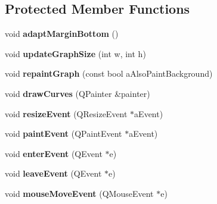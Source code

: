 \subsection*{Protected Member Functions}
\begin{DoxyCompactItemize}
\item 
\hypertarget{class_graph_view_a9ed59f9cc9a902cc3c407800ff1a64c2}{void {\bfseries adapt\-Margin\-Bottom} ()}\label{class_graph_view_a9ed59f9cc9a902cc3c407800ff1a64c2}

\item 
\hypertarget{class_graph_view_a0bda802ecad94f394393745de71b4b37}{void {\bfseries update\-Graph\-Size} (int w, int h)}\label{class_graph_view_a0bda802ecad94f394393745de71b4b37}

\item 
\hypertarget{class_graph_view_a0958b01cf50eed87071291be2b1d5ec0}{void {\bfseries repaint\-Graph} (const bool a\-Also\-Paint\-Background)}\label{class_graph_view_a0958b01cf50eed87071291be2b1d5ec0}

\item 
\hypertarget{class_graph_view_ad4eace633df1c9c73a43895f4d423c3e}{void {\bfseries draw\-Curves} (Q\-Painter \&painter)}\label{class_graph_view_ad4eace633df1c9c73a43895f4d423c3e}

\item 
\hypertarget{class_graph_view_a21837e36d74ac1e19c9fe6d4a3545583}{void {\bfseries resize\-Event} (Q\-Resize\-Event $\ast$a\-Event)}\label{class_graph_view_a21837e36d74ac1e19c9fe6d4a3545583}

\item 
\hypertarget{class_graph_view_af89df528c7e499b8e62023df58a8cc68}{void {\bfseries paint\-Event} (Q\-Paint\-Event $\ast$a\-Event)}\label{class_graph_view_af89df528c7e499b8e62023df58a8cc68}

\item 
\hypertarget{class_graph_view_aa39faf4e9ef577951eef268bdb4e75cc}{void {\bfseries enter\-Event} (Q\-Event $\ast$e)}\label{class_graph_view_aa39faf4e9ef577951eef268bdb4e75cc}

\item 
\hypertarget{class_graph_view_aad78478dd798e881cf82def8306aaa85}{void {\bfseries leave\-Event} (Q\-Event $\ast$e)}\label{class_graph_view_aad78478dd798e881cf82def8306aaa85}

\item 
\hypertarget{class_graph_view_ad8767aaf41c1dd65cbde0216bd3fbdaf}{void {\bfseries mouse\-Move\-Event} (Q\-Mouse\-Event $\ast$e)}\label{class_graph_view_ad8767aaf41c1dd65cbde0216bd3fbdaf}

\end{DoxyCompactItemize}
